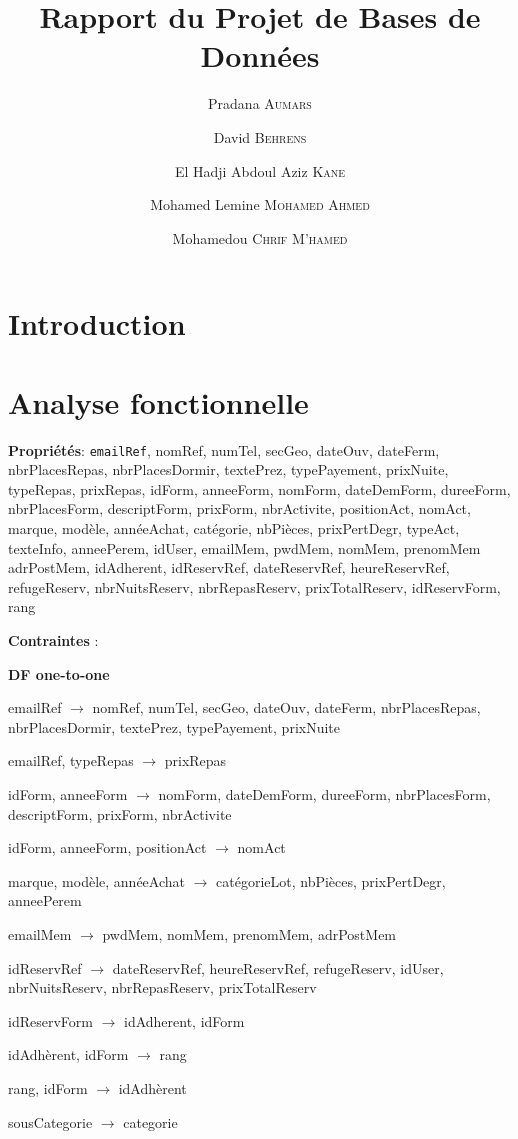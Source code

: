 \documentclass[12pt, a4paper]{article}
\title{Rapport du Projet de Bases de Données}
\author{Pradana \textsc{Aumars}
  \and
  David \textsc{Behrens}
  \and
  El Hadji Abdoul Aziz \textsc{Kane}
  \and
  Mohamed Lemine \textsc{Mohamed Ahmed}
  \and
  Mohamedou \textsc{Chrif M'hamed}}
\begin{document}
\maketitle
\section{Introduction}
\section{Analyse fonctionnelle}
\textbf{Propriétés}: \textnhtt{emailRef}, nomRef, numTel, secGeo, dateOuv, dateFerm, nbrPlacesRepas, nbrPlacesDormir, textePrez, typePayement, prixNuite, typeRepas, prixRepas, idForm, anneeForm, nomForm, dateDemForm, dureeForm, nbrPlacesForm, descriptForm, prixForm, nbrActivite, positionAct, nomAct, marque, modèle, annéeAchat, catégorie, nbPièces, prixPertDegr, typeAct, texteInfo, anneePerem, idUser, emailMem, pwdMem, nomMem, prenomMem adrPostMem, idAdherent, idReservRef, dateReservRef, heureReservRef, refugeReserv, nbrNuitsReserv, nbrRepasReserv, prixTotalReserv, idReservForm, rang

\textbf{Contraintes} :

\textbf{DF one-to-one}

emailRef $\rightarrow$ nomRef, numTel, secGeo, dateOuv, dateFerm, nbrPlacesRepas, nbrPlacesDormir, textePrez, typePayement, prixNuite

emailRef, typeRepas $\rightarrow$ prixRepas

idForm, anneeForm $\rightarrow$ nomForm, dateDemForm, dureeForm, nbrPlacesForm, descriptForm, prixForm, nbrActivite

idForm, anneeForm, positionAct $\rightarrow$ nomAct

marque, modèle, annéeAchat $\rightarrow$ catégorieLot, nbPièces, prixPertDegr, anneePerem

emailMem $\rightarrow$ pwdMem, nomMem, prenomMem, adrPostMem

idReservRef $\rightarrow$ dateReservRef, heureReservRef, refugeReserv, idUser, nbrNuitsReserv, nbrRepasReserv, prixTotalReserv

idReservForm $\rightarrow$ idAdherent, idForm

idAdhèrent, idForm $\rightarrow$ rang

rang, idForm $\rightarrow$ idAdhèrent

sousCategorie $\rightarrow$ categorie
\end{document}
